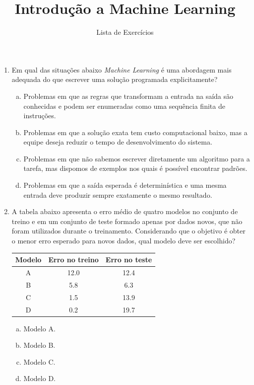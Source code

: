 \documentclass{dlproblemset}
\title{Introdução a Machine Learning}
\subtitle{Lista de Exercícios}
\begin{document}
\begin{enumerate}[1)]

    \item Em qual das situações abaixo \textit{Machine Learning} é uma abordagem mais adequada do que escrever uma solução programada explicitamente?
    \begin{enumerate}[(a)]
        \item Problemas em que as regras que transformam a entrada na saída são conhecidas e podem ser enumeradas como uma sequência finita de instruções.
        \item Problemas em que a solução exata tem custo computacional baixo, mas a equipe deseja reduzir o tempo de desenvolvimento do sistema.
        \item Problemas em que não sabemos escrever diretamente um algoritmo para a tarefa, mas dispomos de exemplos nos quais é possível encontrar padrões.
        \item Problemas em que a saída esperada é determinística e uma mesma entrada deve produzir sempre exatamente o mesmo resultado.
    \end{enumerate}

    \item A tabela abaixo apresenta o erro médio de quatro modelos no conjunto de treino e em um conjunto de teste formado apenas por dados novos, que não foram utilizados durante o treinamento. Considerando que o objetivo é obter o menor erro esperado para novos dados, qual modelo deve ser escolhido?

    \begin{center}
    \begin{tabular}{|c|c|c|}
        \hline
        Modelo & Erro no treino & Erro no teste \\
        \hline
        A & 12.0 & 12.4 \\
        \hline
        B & 5.8 & 6.3 \\
        \hline
        C & 1.5 & 13.9 \\
        \hline
        D & 0.2 & 19.7 \\
        \hline
    \end{tabular}
    \end{center}

    \begin{enumerate}[(a)]
        \item Modelo A.
        \item Modelo B.
        \item Modelo C.
        \item Modelo D.
    \end{enumerate}


\end{enumerate}
\end{document}
